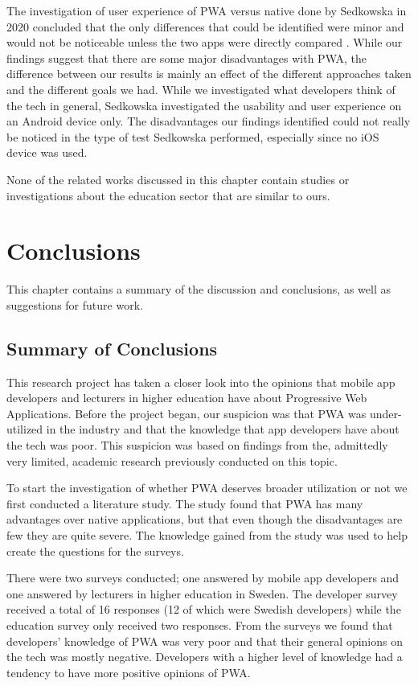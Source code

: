 \documentclass[a4paper,12pt]{article}
\begin{document}
The investigation of user experience of PWA versus native done by Sedkowska in 2020 concluded that the only differences that could be identified were minor and would not be noticeable unless the two apps were directly compared \cite{thesis_pwa_ux}. While our findings suggest that there are some major disadvantages with PWA, the difference between our results is mainly an effect of the different approaches taken and the different goals we had. While we investigated what developers think of the tech in general, Sedkowska investigated the usability and user experience on an Android device only. The disadvantages our findings identified could not really be noticed in the type of test Sedkowska performed, especially since no iOS device was used.

None of the related works discussed in this chapter contain studies or investigations about the education sector that are similar to ours.

\newpage

\section{Conclusions}
\label{Conclusions}
This chapter contains a summary of the discussion and conclusions, as well as suggestions for future work.

\subsection{Summary of Conclusions}
\label{Conclusions_summary}
This research project has taken a closer look into the opinions that mobile app developers and lecturers in higher education have about Progressive Web Applications. Before the project began, our suspicion was that PWA was under-utilized in the industry and that the knowledge that app developers have about the tech was poor. This suspicion was based on findings from the, admittedly very limited, academic research previously conducted on this topic.

To start the investigation of whether PWA deserves broader utilization or not we first conducted a literature study. The study found that PWA has many advantages over native applications, but that even though the disadvantages are few they are quite severe. The knowledge gained from the study was used to help create the questions for the surveys.

There were two surveys conducted; one answered by mobile app developers and one answered by lecturers in higher education in Sweden. The developer survey received a total of 16 responses (12 of which were Swedish developers) while the education survey only received two responses. From the surveys we found that developers' knowledge of PWA was very poor and that their general opinions on the tech was mostly negative. Developers with a higher level of knowledge had a tendency to have more positive opinions of PWA.
\end{document}
